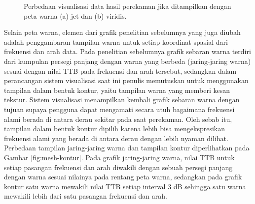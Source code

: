 \begin{figure}[t!]
	\centering
	\caption{Perbedaan visualisasi data hasil perekaman jika ditampilkan dengan peta warna (a) jet dan (b) viridis.}
	\label{fig:mesh-bedawarna}
\end{figure}

Selain peta warna, elemen dari grafik penelitian sebelumnya yang juga diubah adalah penggambaran tampilan warna untuk setiap koordinat spasial dari frekuensi dan arah data. Pada penelitian sebelumnya grafik sebaran warna terdiri dari kumpulan persegi panjang dengan warna yang berbeda (jaring-jaring warna) sesuai dengan nilai TTB pada frekuensi dan arah tersebut, sedangkan dalam perancangan sistem visualisasi saat ini penulis memutuskan untuk menggunakan tampilan dalam bentuk kontur, yaitu tampilan warna yang memberi kesan tekstur. Sistem visualisasi menampilkan kembali grafik sebaran warna dengan tujuan supaya pengguna dapat mengamati secara utuh bagaimana frekuensi alami \bundengan berada di antara derau sekitar pada saat perekaman. Oleh sebab itu, tampilan dalam bentuk kontur dipilih karena lebih bisa mengekspresikan frekuensi alami \bundengan yang berada di antara derau dengan lebih nyaman dilihat. Perbedaan tampilan jaring-jaring warna dan tampilan kontur diperlihatkan pada Gambar \ref{fig:mesh-kontur}. Pada grafik jaring-jaring warna, nilai TTB untuk setiap pasangan frekuensi dan arah diwakili dengan sebuah persegi panjang dengan warna sesuai nilainya pada rentang peta warna, sedangkan pada grafik kontur satu warna mewakili nilai TTB setiap interval 3 dB sehingga satu warna mewakili lebih dari satu pasangan frekuensi dan arah. \par 

